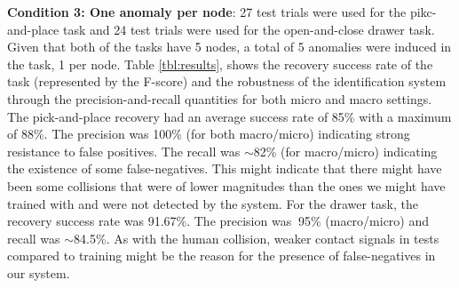 \documentclass[letterpaper, 10 pt, conference]{ieeeconf}  %
\begin{document}
\textbf{Condition 3: One anomaly per node}: 27 test trials were used for the pikc-and-place task and 24 test trials were used for the open-and-close drawer task. Given that both of the tasks have 5 nodes, a total of 5 anomalies were induced in the task, 1 per node. Table \ref{tbl:results}, shows the recovery success rate of the task (represented by the F-score) and the robustness of the identification system through the precision-and-recall quantities for both micro and macro settings. The pick-and-place recovery had an average success rate of 85\% with a maximum of 88\%. The precision was 100\% (for both macro/micro) indicating strong resistance to false positives. The recall was $\sim$82\% (for macro/micro) indicating the existence of some false-negatives. This might indicate that there might have been some collisions that were of lower magnitudes than the ones we might have trained with and were not detected by the system. For the drawer task, the recovery success rate was 91.67\%. The precision was $~$95\% (macro/micro) and recall was $\sim$84.5\%. As with the human collision, weaker contact signals in tests compared to training might be the reason for the presence of false-negatives in our system. \\
\end{document}
